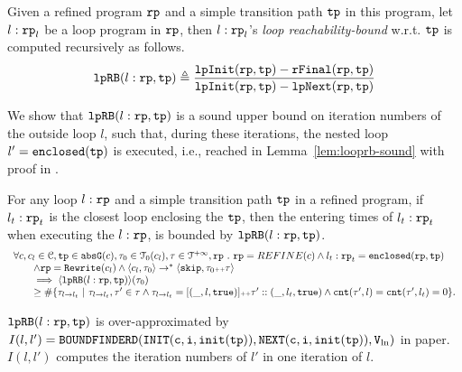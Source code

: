 %
\begin{defn}
  \label{def:looprb}
  Given a refined program $\mathtt{rp}$ and a simple transition path $\mathtt{tp}$ in this program, 
  let $l: \mathtt{rp}_l$ be a loop program in $\mathtt{rp}$,
  then $l: \mathtt{rp}_l$'s \emph{loop reachability-bound} w.r.t. $\mathtt{tp}$
  is computed recursively as follows. 
  \[
    \mathtt{lpRB}(l: \mathtt{rp}, \mathtt{tp}) \triangleq
    \frac{\mathtt{lpInit}(\mathtt{rp}, \mathtt{tp}) - \mathtt{rFinal}(\mathtt{rp}, \mathtt{tp})}{\mathtt{lpInit}(\mathtt{rp}, \mathtt{tp}) - \mathtt{lpNext}(\mathtt{rp}, \mathtt{tp})}
  \]
\end{defn}
%
We show that $\mathtt{lpRB}(l: \mathtt{rp}, \mathtt{tp})$
is a sound upper bound on iteration numbers of the outside loop $l$,
such that,
during these iterations, the nested loop $l' = \mathtt{enclosed(\mathtt{tp})}$ is executed, i.e., reached in Lemma~\ref{lem:looprb-sound} with proof in .
\begin{lem}
  \label{lem:looprb-sound}
  For any loop $l: \mathtt{rp}$ and a simple transition path $\mathtt{tp}$ in a refined program, if $l_t: \mathtt{rp}_t$ is the closest loop enclosing the $\mathtt{tp}$, then the entering times of $l_t: \mathtt{rp}_t$ when executing the $l: \mathtt{rp}$, is bounded by $\mathtt{lpRB}(l: \mathtt{rp}, \mathtt{tp})$.
  \[
    \begin{array}{l}
    \forall c, c_l \in \cdom, \tpath \in \absG(c), \trace_0 \in \tdom_0(c_l), \trace \in \inftdom, \rprog \st 
    \rprog = REFINE(c)
    \land
    l_t: \rprog_t = \kw{enclosed}(\rprog, \tpath)
    \\ \qquad
    \land 
    \rprog = \algrewrite(c_l)
    \land
    \config{c_l, \trace_0} \to^* 
    \config{\eskip, \trace_0 \tracecat \trace}
    \\ \qquad
    \implies
    \config{\lpchB(l: \rprog, \tpath)}(\trace_0) 
    \\ \qquad \geq 
    \# \left\{\trace_{l \to l_t} ~\vert~ \trace_{l \to l_t}, \trace' \in \trace \land \trace_{l \to l_t} = [(\_, l, \etrue)] \tracecat \trace' :: (\_, l_t, \etrue)
    \land \counter(\trace', l) = \counter(\trace', l_t) = 0 
    \right\}.
    \end{array}
  \]
\end{lem}
%
$\mathtt{lpRB}(l:\mathtt{rp}, \mathtt{tp})$ is over-approximated by
$I(l, l') = \mathtt{BOUNDFINDERD(INIT(c, i, \mathtt{init}(\mathtt{tp})), NEXT(c, i, \mathtt{init}(\mathtt{tp})), V_{\ln})}$ in paper\cite{GulwaniJK09}.
$I(l, l')$ computes the iteration numbers of $l'$ in one iteration of $l$.
